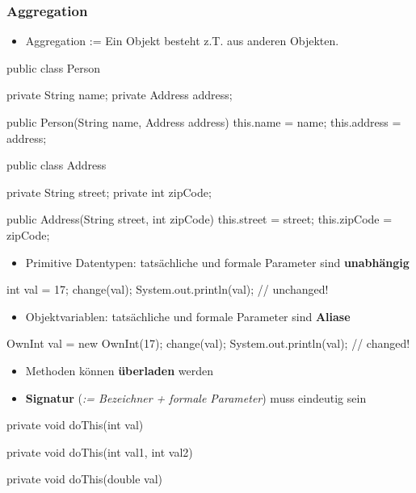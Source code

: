 \documentclass[a4paper,10pt, dvipsnames]{report}
\begin{document}
\subsubsection{Aggregation}

\begin{itemize}
	\item Aggregation := Ein Objekt besteht z.T. aus anderen Objekten.
\end{itemize}

\begin{javacodebox}
public class Person {
    private String name;
    private Address address;

    public Person(String name, Address address) {
        this.name = name;
        this.address = address;
    }
}

public class Address {
    private String street;
    private int zipCode;

    public Address(String street, int zipCode) {
        this.street = street;
        this.zipCode = zipCode;
    }
}
\end{javacodebox}

\begin{itemize}
    \item Primitive Datentypen: tatsächliche und formale Parameter sind \textbf{unabhängig}
\end{itemize}

\begin{javacodebox}
int val = 17;
change(val);
System.out.println(val); // unchanged!
\end{javacodebox}

\begin{itemize}
    \item Objektvariablen: tatsächliche und formale Parameter sind \textbf{Aliase}
\end{itemize}

\begin{javacodebox}
OwnInt val = new OwnInt(17);
change(val);
System.out.println(val); // changed!
\end{javacodebox}

\begin{itemize}
    \item Methoden können \textbf{überladen} werden
    \item \textbf{Signatur} (\textit{:= Bezeichner + formale Parameter}) muss eindeutig sein
\end{itemize}

\begin{javacodebox}
private void doThis(int val) {
}

private void doThis(int val1, int val2) {
}

private void doThis(double val) {
}
\end{javacodebox}
\end{document}
